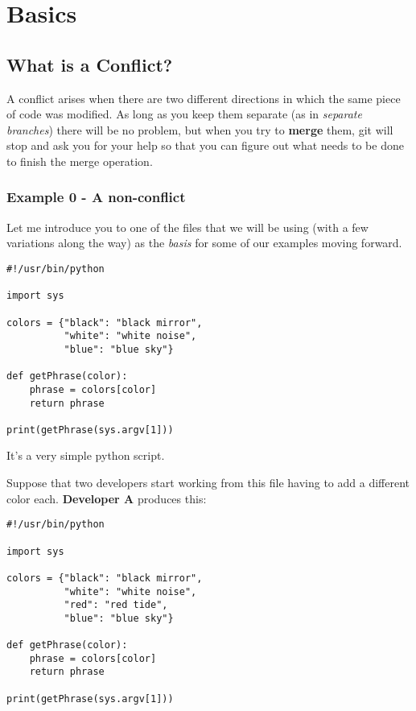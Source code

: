 
\chapter{Basics}
\section{What is a Conflict?}

A conflict arises when there are two different directions in which the same piece of code was modified. As long as you keep them separate
(as in {\it separate branches}) there will be no problem, but when you try to {\bf merge} them, git will stop and ask you for your help
so that you can figure out what needs to be done to finish the merge operation.

\subsection{Example 0 - A non-conflict}
\label{example_00}

Let me introduce you to one of the files that we will be using (with a few variations along the way) as the {\it basis} for some of our
examples moving forward.

\begin{lstlisting}[style=python_style, caption={\bf Example 0} - common ancestor]
#!/usr/bin/python

import sys

colors = {"black": "black mirror",
          "white": "white noise",
          "blue": "blue sky"}

def getPhrase(color):
    phrase = colors[color]
    return phrase

print(getPhrase(sys.argv[1]))
\end{lstlisting}

It's a very simple python script.

Suppose that two developers start working from this file having to add a different color each. {\bf Developer A} produces this:

\begin{lstlisting}[style=python_style, caption={\bf Example 0} - Developer A]
#!/usr/bin/python

import sys

colors = {"black": "black mirror",
          "white": "white noise",
          "red": "red tide",
          "blue": "blue sky"}

def getPhrase(color):
    phrase = colors[color]
    return phrase

print(getPhrase(sys.argv[1]))
\end{lstlisting}

